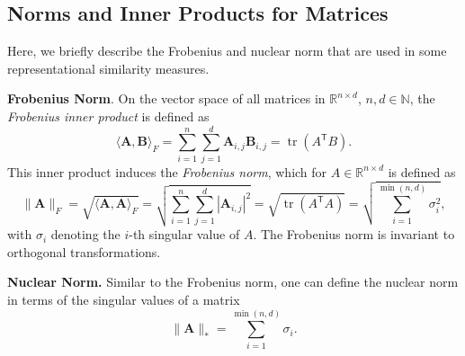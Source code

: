 \documentclass{article}
\newcommand{\Nat}{\mathbb{N}}
\newcommand{\Real}{\mathbb{R}}
\newcommand{\transp}{\mathsf{T}}
\newcommand{\subheader}{\textbf}
\begin{document}
\begin{refsegment}
\subsection{Norms and Inner Products for Matrices}
Here, we briefly describe the Frobenius and nuclear norm that are used in some representational similarity measures.

\subheader{Frobenius Norm}. On the vector space of all matrices in $\Real^{n \times d}$, $n,d\in\Nat$, the \emph{Frobenius inner product} is defined as
\begin{equation}\label{eq:frobenius_prod}
    \langle \bm{A}, \bm{B} \rangle_F
    = \textstyle\sum_{i=1}^n \textstyle\sum_{j=1}^d \bm{A}_{i,j} \bm{B}_{i,j} = \operatorname{tr}(A^\transp B).
\end{equation}
This inner product induces the \emph{Frobenius norm}, which for $A\in \Real^{n \times d}$ is defined as
\begin{equation}\label{eq:frobenius_norm}
    \| \bm{A} \|_F = \sqrt{\langle \bm{A}, \bm{A} \rangle_F}
    = \sqrt{\textstyle\sum_{i=1}^n \textstyle\sum_{j=1}^d |\bm{A}_{i,j}|^2 } = \sqrt{\operatorname{tr}(A^\transp A)}
    = \sqrt{\textstyle\sum_{i=1}^{\min(n,d)} \sigma_i^2},
\end{equation}
with $\sigma_i$ denoting the $i$-th singular value of $A$. The Frobenius norm is invariant to orthogonal transformations.

\subheader{Nuclear Norm.}
Similar to the Frobenius norm, one can define the nuclear norm in terms of the singular values of a matrix
\begin{equation}\label{eq:nuclear_norm}
   \| \bm{A} \|_* = \textstyle\sum_{i=1}^{\min(n,d)} \sigma_i.
\end{equation}



\end{refsegment}
\end{document}
